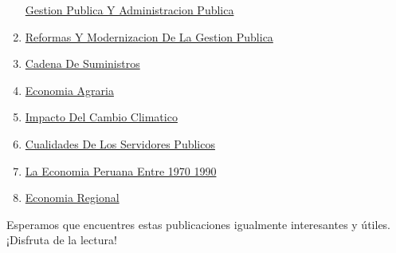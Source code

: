 \documentclass[
  jou,
  floatsintext,
  longtable,
  a4paper,
  nolmodern,
  notxfonts,
  notimes,
  colorlinks=true,linkcolor=blue,citecolor=blue,urlcolor=blue]{apa7}
\begin{document}
\begin{enumerate}
  \href{https://achalmaedison.netlify.app/blog/posts/2021-10-01-gestion-publica-y-administracion-publica/index.pdf}{}
  \href{https://achalmaedison.netlify.app/blog/posts/2021-10-01-gestion-publica-y-administracion-publica}{Gestion
  Publica Y Administracion Publica}
\item
  \href{https://achalmaedison.netlify.app/blog/posts/2021-10-01-reformas-y-modernizacion-de-la-gestion-publica/index.pdf}{}
  \href{https://achalmaedison.netlify.app/blog/posts/2021-10-01-reformas-y-modernizacion-de-la-gestion-publica}{Reformas
  Y Modernizacion De La Gestion Publica}
\item
  \href{https://achalmaedison.netlify.app/blog/posts/2022-01-23-cadena\%20de\%20suministros/index.pdf}{}
  \href{https://achalmaedison.netlify.app/blog/posts/2022-01-23-cadena\%20de\%20suministros}{Cadena
  De Suministros}
\item
  \href{https://achalmaedison.netlify.app/blog/posts/2022-04-22-economia-agraria/index.pdf}{}
  \href{https://achalmaedison.netlify.app/blog/posts/2022-04-22-economia-agraria}{Economia
  Agraria}
\item
  \href{https://achalmaedison.netlify.app/blog/posts/2022-06-02-impacto-del-cambio-climatico/index.pdf}{}
  \href{https://achalmaedison.netlify.app/blog/posts/2022-06-02-impacto-del-cambio-climatico}{Impacto
  Del Cambio Climatico}
\item
  \href{https://achalmaedison.netlify.app/blog/posts/2023-05-11-cualidades-de-los-servidores-publicos/index.pdf}{}
  \href{https://achalmaedison.netlify.app/blog/posts/2023-05-11-cualidades-de-los-servidores-publicos}{Cualidades
  De Los Servidores Publicos}
\item
  \href{https://achalmaedison.netlify.app/blog/posts/2023-05-12-la-economia-peruana-entre-1970-1990/index.pdf}{}
  \href{https://achalmaedison.netlify.app/blog/posts/2023-05-12-la-economia-peruana-entre-1970-1990}{La
  Economia Peruana Entre 1970 1990}
\item
  \href{https://achalmaedison.netlify.app/blog/posts/2023-05-16-economia-regional/index.pdf}{}
  \href{https://achalmaedison.netlify.app/blog/posts/2023-05-16-economia-regional}{Economia
  Regional}
\end{enumerate}

Esperamos que encuentres estas publicaciones igualmente interesantes y
útiles. ¡Disfruta de la lectura!
\end{document}
